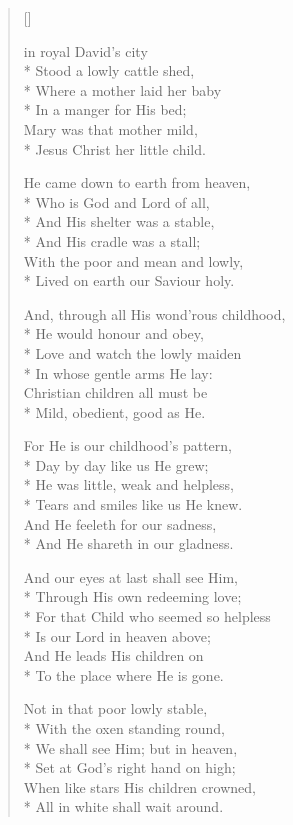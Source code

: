 \newHymn
{}

\begin{verse}[\versewidth]

 in royal David's city\\*
            Stood a lowly cattle shed,\\*
            Where a mother laid her baby\\*
            In a manger for His bed;\\
Mary was that mother mild,\\*
Jesus Christ her little child.

He came down to earth from heaven,\\*
Who is God and Lord of all,\\*
And His shelter was a stable,\\*
And His cradle was a stall;\\
With the poor and mean and lowly,\\*
Lived on earth our Saviour holy.

And, through all His wond'rous childhood,\\*
He would honour and obey,\\*
Love and watch the lowly maiden\\*
In whose gentle arms He lay:\\
Christian children all must be\\*
Mild, obedient, good as He.

For He is our childhood's pattern,\\*
Day by day like us He grew;\\*
He was little, weak and helpless,\\*
Tears and smiles like us He knew.\\
And He feeleth for our sadness,\\*
And He shareth in our gladness.

And our eyes at last shall see Him,\\*
Through His own redeeming love;\\*
For that Child who seemed so helpless\\*
Is our Lord in heaven above;\\
And He leads His children on\\*
To the place where He is gone.

Not in that poor lowly stable,\\*
With the oxen standing round,\\*
We shall see Him; but in heaven,\\*
Set at God's right hand on high;\\
When like stars His children crowned,\\*
All in white shall wait around.



\end{verse}



